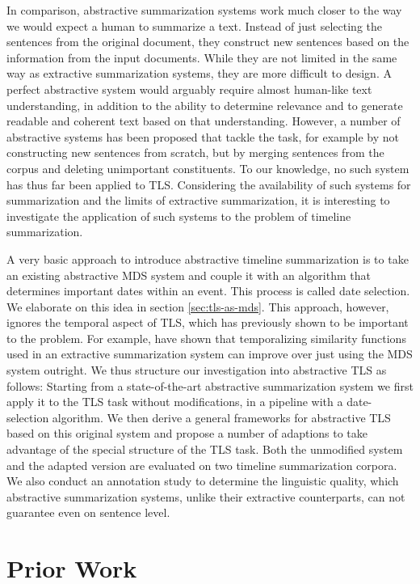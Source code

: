 \documentclass[a4paper,BCOR=10mm]{report}
\begin{document}
In comparison, abstractive summarization systems work much closer to the way we would expect a human to summarize a text. Instead of just selecting the sentences from the original document, they construct new sentences based on the information from the input documents. While they are not limited in the same way as extractive summarization systems, they are more difficult to design. A perfect abstractive system would arguably require almost human-like text understanding, in addition to the ability to determine relevance and to generate readable and coherent text based on that understanding. However, a number of abstractive systems has been proposed that tackle the task, for example by not constructing new sentences from scratch, but by merging sentences from the corpus and deleting unimportant constituents. To our knowledge, no such system has thus far been applied to TLS. Considering the availability of such systems for summarization and the limits of extractive summarization, it is interesting to investigate the application of such systems to the problem of timeline summarization.

A very basic approach to introduce abstractive timeline summarization is to take an existing abstractive MDS system and couple it with an algorithm that determines important dates within an event. This process is called date selection. We elaborate on this idea in section \ref{sec:tls-as-mds}. This approach, however, ignores the temporal aspect of TLS, which has previously shown to be important to the problem. For example, \citet{markert} have shown that temporalizing similarity functions used in an extractive summarization system can improve over just using the MDS system outright.
We thus structure our investigation into abstractive TLS as follows:
Starting from a state-of-the-art abstractive summarization system we first apply it to the TLS task without modifications, in a pipeline with a date-selection algorithm.
We then derive a general frameworks for abstractive TLS based on this original system and propose a number of adaptions to take advantage of the special structure of the TLS task.
Both the unmodified system and the adapted version are evaluated on two timeline summarization corpora. We also conduct an annotation study to determine the linguistic quality, which abstractive summarization systems, unlike their extractive counterparts, can not guarantee even on sentence level.


\chapter{Prior Work}
\end{document}
